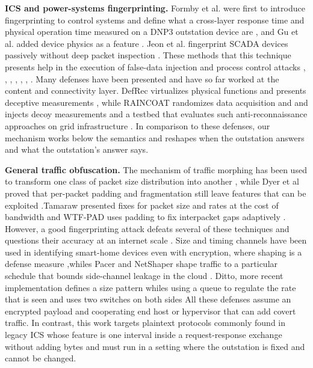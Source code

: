 \documentclass[conference]{IEEEtran}
\begin{document}
\textbf{ICS and power-systems fingerprinting.} Formby et al. were first to introduce fingerprinting to control systems and define what a cross-layer response time and physical operation time measured on a DNP3 outstation device are \cite{formby2016}, and Gu et al. added device physics as a feature \cite{gu2018}. Jeon et al. fingerprint SCADA devices passively without deep packet inspection \cite{jeon2016passive}. These methods that this technique presents help in the execution of false-data injection and process control attacks \cite{liufdia2009}, \cite{cardenas2011}, \cite{kohno2005}, \cite{gtid2015}, \cite{gu2018}, \cite{jeon2016passive}, \cite{cardenas2011}. Many defenses have been presented and have so far worked at the content and connectivity layer. DefRec virtualizes physical functions and presents deceptive measurements \cite{defrec2020}, while RAINCOAT randomizes data acquisition and and injects decoy measurements \cite{raincoat2019} and a testbed that evaluates such anti-reconnaissance approaches on grid infrastructure \cite{lincps2016}. In comparison to these defenses, our mechanism works below the semantics and reshapes when the outstation answers and what the outstation's answer says.

\textbf{General traffic obfuscation. }The mechanism of traffic morphing has been used to transform one class of packet size distribution into another \cite{wright2009}, while Dyer et al proved that per-packet padding and fragmentation still leave features that can be exploited \cite{dyer2012}.Tamaraw presented fixes for packet size and rates at the cost of bandwidth \cite{tamaraw2014} and WTF-PAD uses padding to fix interpacket gaps adaptively \cite{juarez2016}. However, a good fingerprinting attack defeats several of these techniques \cite{sirinam2018} and questions their accuracy at an internet scale \cite{panchenko2016}. Size and timing channels have been used in identifying smart-home devices even with encryption, where shaping is a defense measure \cite{apthorpe2019},whiles Pacer and NetShaper shape  traffic to a particular schedule that bounds side-channel leakage in the cloud \cite{pacer2022,netshaper2024}. Ditto,  more recent implementation defines a size pattern whiles using a queue to regulate the rate that is seen and uses two switches on both sides \cite{ditto2022}  All these defenses assume an encrypted payload and cooperating end host or hypervisor that can add covert traffic. In contrast, this work targets plaintext protocols commonly found in legacy ICS whose feature is one interval inside a request-response exchange without adding bytes and must run in a setting where the outstation is fixed and cannot be changed. 
\end{document}
